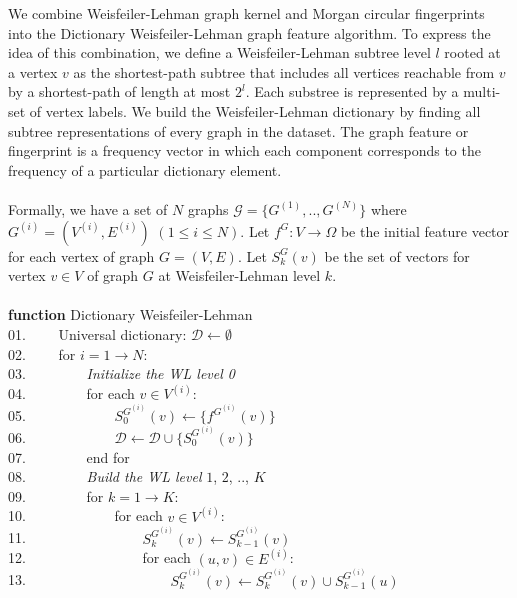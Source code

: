 \documentclass[a4paper]{article}
\begin{document}
We combine Weisfeiler-Lehman graph kernel \cite{Nino} and Morgan circular fingerprints into the Dictionary Weisfeiler-Lehman graph feature algorithm. To express the idea of this combination, we define a Weisfeiler-Lehman subtree level $l$ rooted at a vertex $v$ as the shortest-path subtree that includes all vertices reachable from $v$ by a shortest-path of length at most $2^l$. Each substree is represented by a multi-set of vertex labels. We build the Weisfeiler-Lehman dictionary by finding all subtree representations of every graph in the dataset. The graph feature or fingerprint is a frequency vector in which each component corresponds to the frequency of a particular dictionary element. \\ \\
Formally, we have a set of $N$ graphs $\mathcal{G} = \{G^{(1)}, .., G^{(N)}\}$ where $G^{(i)} = (V^{(i)}, E^{(i)})$ $(1 \leq i \leq N)$. Let $f^G: V \rightarrow \Omega$ be the initial feature vector for each vertex of graph $G = (V, E)$. Let $S^G_k(v)$ be the set of vectors for vertex $v \in V$ of graph $G$ at Weisfeiler-Lehman level $k$. \\ \\
\textbf{function} Dictionary Weisfeiler-Lehman \\
01. \ \ \ \ Universal dictionary: $\mathcal{D} \leftarrow \emptyset$ \\
02. \ \ \ \ for $i = 1 \rightarrow N$: \\
03. \ \ \ \ \ \ \ \ \textit{Initialize the WL level 0} \\
04. \ \ \ \ \ \ \ \ for each $v \in V^{(i)}$: \\
05. \ \ \ \ \ \ \ \ \ \ \ \ $S^{G^{(i)}}_0(v) \leftarrow \{f^{G^{(i)}}(v)\}$ \\
06. \ \ \ \ \ \ \ \ \ \ \ \ $\mathcal{D} \leftarrow \mathcal{D} \cup \{S^{G^{(i)}}_0(v)\}$ \\
07. \ \ \ \ \ \ \ \ end for \\
08. \ \ \ \ \ \ \ \ \textit{Build the WL level} $1$, $2$, .., $K$ \\
09. \ \ \ \ \ \ \ \ for $k = 1 \rightarrow K$: \\
10. \ \ \ \ \ \ \ \ \ \ \ \ for each $v \in V^{(i)}$: \\
11. \ \ \ \ \ \ \ \ \ \ \ \ \ \ \ \ $S^{G^{(i)}}_k(v) \leftarrow S^{G^{(i)}}_{k - 1}(v)$ \\
12. \ \ \ \ \ \ \ \ \ \ \ \ \ \ \ \ for each $(u, v) \in E^{(i)}$: \\
13. \ \ \ \ \ \ \ \ \ \ \ \ \ \ \ \ \ \ \ \ $S^{G^{(i)}}_k(v) \leftarrow S^{G^{(i)}}_k(v) \cup S^{G^{(i)}}_{k - 1}(u)$ \\
\end{document}
